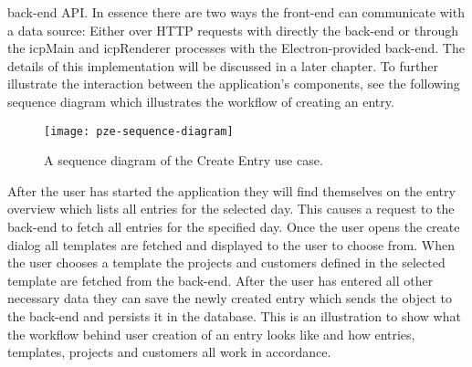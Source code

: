back-end API.
In essence there are two ways the front-end can communicate with a data source:
Either over HTTP requests with directly the back-end or through the icpMain and icpRenderer processes with the Electron-provided back-end.
The details of this implementation will be discussed in a later chapter. 
To further illustrate the interaction between the application's components, see the following sequence diagram which illustrates
the workflow of creating an entry. 
\begin{figure}[H]
  \centering
  \label{fig:pze-sequence-diagram}
  \caption{A sequence diagram of the Create Entry use case.}
  \texttt{[image: pze-sequence-diagram]}
\end{figure}
After the user has started the application they will find themselves on the entry overview which lists all entries for the selected day.
This causes a request to the back-end to fetch all entries for the specified day. 
Once the user opens the create dialog all templates are fetched and displayed to the user to choose from. 
When the user chooses a template the projects and customers defined in the selected template are fetched from the back-end. 
After the user has entered all other necessary data they can save the newly created entry which sends the object to the back-end 
and persists it in the database. 
This is an illustration to show what the workflow behind user creation of an entry looks like and how 
entries, templates, projects and customers all work in accordance.